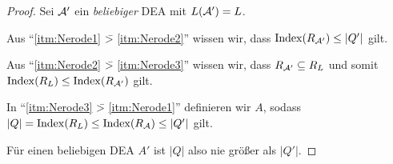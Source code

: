 \begin{proof}
        Sei $\mathcal{A}'$ ein \emph{beliebiger} \ac{DEA} mit $L(\mathcal{A}')=L$.
        
        Aus "`\ref{itm:Nerode1} {\=>} \ref{itm:Nerode2}"' wissen wir, dass $\operatorname{Index}(R_{\mathcal{A}'})\leq |Q'|$ gilt.
        
        Aus "`\ref{itm:Nerode2} \=> \ref{itm:Nerode3}"' wissen wir, dass $R_{\mathcal{A}'}\subseteq R_L$ und somit $\operatorname{Index}(R_L) \leq \operatorname{Index}(R_{\mathcal{A}'})$ gilt.
        
        In "`\ref{itm:Nerode3} \=> \ref{itm:Nerode1}"' definieren wir $A$, sodass $|Q|=\operatorname{Index}(R_L) \leq \operatorname{Index}(R_{\mathcal{A}})\leq |Q'|$ gilt.
        
        Für einen beliebigen \acs*{DEA} $A'$ ist $|Q|$ also nie größer als $|Q'|$.
\end{proof}

